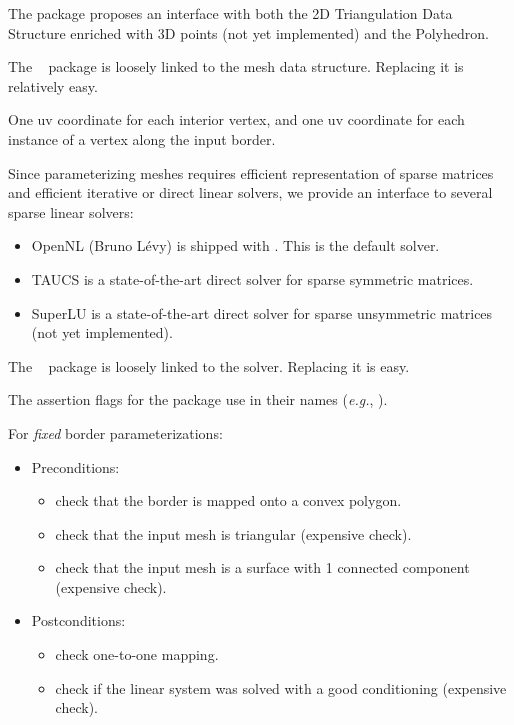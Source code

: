 The package proposes
an interface with both the 2D Triangulation Data Structure enriched
with 3D points (not yet implemented) and the Polyhedron.

The \cgal\  package is loosely linked to the
mesh data structure. Replacing it is relatively easy.



One uv coordinate for each interior vertex, and one uv coordinate for
each instance of a vertex along the input border.



Since parameterizing meshes requires
efficient representation of sparse matrices and efficient iterative or
direct linear solvers, we provide an interface to several
sparse linear solvers:
\begin{itemize}
\item OpenNL (Bruno L{\'e}vy) is shipped with \cgal. This is the default solver.
\item TAUCS is a state-of-the-art direct solver for sparse symmetric matrices.
\item SuperLU is a state-of-the-art direct solver for sparse unsymmetric matrices (not yet implemented).
\end{itemize}

The \cgal\  package is loosely linked to the
solver. Replacing it is easy.



The assertion flags for the package
use  in their names (\textit{e.g.},
).

For \emph{fixed} border parameterizations:
\begin{itemize}
\item Preconditions:
    \begin{itemize}
    \item check that the border is mapped onto a convex polygon.
    \item check that the input mesh is triangular (expensive check).
    \item check that the input mesh is a surface with 1 connected component (expensive check).
    \end{itemize}
\item Postconditions:
    \begin{itemize}
    \item check one-to-one mapping.
    \item check if the linear system was solved with a good conditioning (expensive check).
    \end{itemize}
\end{itemize}

